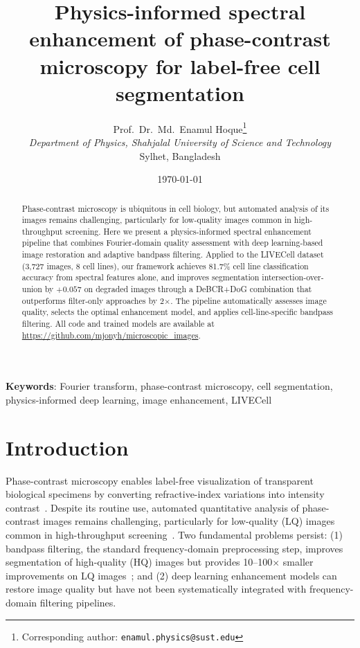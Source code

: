 \documentclass[11pt,a4paper]{article}
\title{\textbf{Physics-informed spectral enhancement of phase-contrast microscopy for label-free cell segmentation}}
\author{
Prof.~Dr.~Md.~Enamul Hoque\thanks{Corresponding author: \texttt{enamul.physics@sust.edu}} \\
\textit{Department of Physics, Shahjalal University of Science and Technology} \\
Sylhet, Bangladesh
}
\date{\today}
\begin{document}
\maketitle

\begin{abstract}
Phase-contrast microscopy is ubiquitous in cell biology, but automated analysis of its images remains challenging, particularly for low-quality images common in high-throughput screening. Here we present a physics-informed spectral enhancement pipeline that combines Fourier-domain quality assessment with deep learning-based image restoration and adaptive bandpass filtering. Applied to the LIVECell dataset (3,727 images, 8 cell lines), our framework achieves 81.7\% cell line classification accuracy from spectral features alone, and improves segmentation intersection-over-union by $+0.057$ on degraded images through a DeBCR+DoG combination that outperforms filter-only approaches by 2$\times$. The pipeline automatically assesses image quality, selects the optimal enhancement model, and applies cell-line-specific bandpass filtering. All code and trained models are available at \url{https://github.com/mjonyh/microscopic_images}.
\end{abstract}

\textbf{Keywords}: Fourier transform, phase-contrast microscopy, cell segmentation, physics-informed deep learning, image enhancement, LIVECell

\section{Introduction}
\label{sec:intro}

Phase-contrast microscopy enables label-free visualization of transparent biological specimens by converting refractive-index variations into intensity contrast~\cite{zernike1942}. Despite its routine use, automated quantitative analysis of phase-contrast images remains challenging, particularly for low-quality (LQ) images common in high-throughput screening~\cite{edlund2021livecell}. Two fundamental problems persist: (1) bandpass filtering, the standard frequency-domain preprocessing step, improves segmentation of high-quality (HQ) images but provides 10--100$\times$ smaller improvements on LQ images~\cite{gonzalez2018digital}; and (2) deep learning enhancement models can restore image quality but have not been systematically integrated with frequency-domain filtering pipelines.
\end{document}

